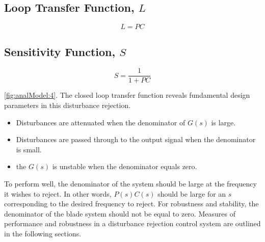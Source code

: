 \subsection*{Loop Transfer Function, $L$}
\begin{equation}
   L = PC
\end{equation}

\subsection*{Sensitivity Function, $S$}
\begin{equation}
   S = \frac{1}{1+PC}
\end{equation}





 

\ref{fig:analModel:4}. The closed loop transfer function reveals fundamental design parameters in this disturbance rejection.
\begin{itemize}
\item Disturbances are attenuated when the denominator of $G(s)$ is large.
\item Disturbances are passed through to the output signal when the denominator is small.
\item the $G(s)$ is unstable when the denominator equals zero.
\end{itemize}
To perform well, the denominator of the system should be large at the frequency it wishes to reject. In other words, $P(s)C(s)$ should be large for an $s$ corresponding to the desired frequency to reject. For robustness and stability, the denominator of the blade system should not be equal to zero. Measures of performance and robustness in a disturbance rejection control system are outlined in the following sections.

